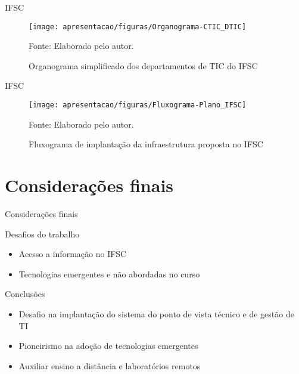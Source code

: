 \documentclass{beamer}
\begin{document}

\begin{frame}{IFSC}
    \begin{figure}[!htpb]
    	\centering
    	\caption{Organograma simplificado dos departamentos de TIC do IFSC}
        \texttt{[image: apresentacao/figuras/Organograma-CTIC\_DTIC]}
        
    	Fonte: Elaborado pelo autor.
     	\label{wordpress_post}
    \end{figure}
\end{frame}


\begin{frame}{IFSC}
    \begin{figure}[!htpb]
    	\centering
    	\caption{Fluxograma de implantação da infraestrutura proposta no IFSC}
        \texttt{[image: apresentacao/figuras/Fluxograma-Plano\_IFSC]}
        
    	Fonte: Elaborado pelo autor.
     	\label{wordpress_post}
    \end{figure}
\end{frame}


\section{Considerações finais}

\begin{frame}{Considerações finais}
    \begin{block}{Desafios do trabalho}
    \begin{itemize}
        \item Acesso a informação no IFSC
        \item Tecnologias emergentes e não abordadas no curso    \end{itemize}
    \end{block}
    
    \begin{block}{Conclusões}
    \begin{itemize}
        \item Desafio na implantação do sistema do ponto de vista técnico e de gestão de TI
        \item Pioneirismo na adoção de tecnologias emergentes
        \item Auxiliar ensino a distância e laboratórios remotos
    \end{itemize}
    \end{block}
\end{frame}
\end{document}
